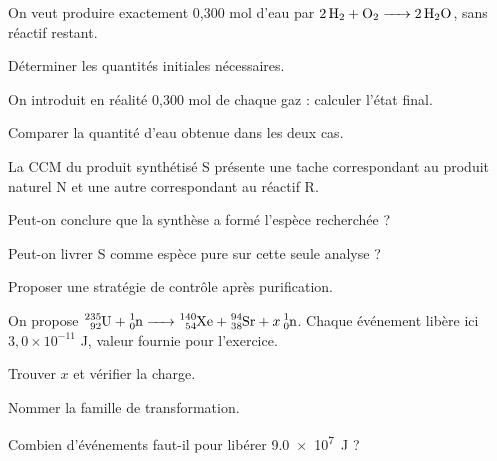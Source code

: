 \label{defi-ex-8-1}
On veut produire exactement 0,300 mol d’eau par $\ce{2 H2 + O2 -> 2 H2O}$, sans réactif restant.
\begin{questions}
\item Déterminer les quantités initiales nécessaires.
\item On introduit en réalité 0,300 mol de chaque gaz : calculer l’état final.
\item Comparer la quantité d’eau obtenue dans les deux cas.
\end{questions}
\smallskip{}\hfill{}

\label{defi-ex-9-1}
La CCM du produit synthétisé S présente une tache correspondant au produit naturel N et une autre correspondant au réactif R.
\begin{questions}
\item Peut-on conclure que la synthèse a formé l’espèce recherchée ?
\item Peut-on livrer S comme espèce pure sur cette seule analyse ?
\item Proposer une stratégie de contrôle après purification.
\end{questions}
\smallskip{}\hfill{}

\label{defi-ex-10-1}
On propose $\ce{^{235}_{92}U + ^{1}_{0}n -> ^{140}_{54}Xe + ^{94}_{38}Sr + x ^{1}_{0}n}$. Chaque événement libère ici $3,0\times10^{-11}$ J, valeur fournie pour l’exercice.
\begin{questions}
\item Trouver $x$ et vérifier la charge.
\item Nommer la famille de transformation.
\item Combien d’événements faut-il pour libérer \qty{9,0e7}{J} ?
\end{questions}
\smallskip{}\hfill{}


